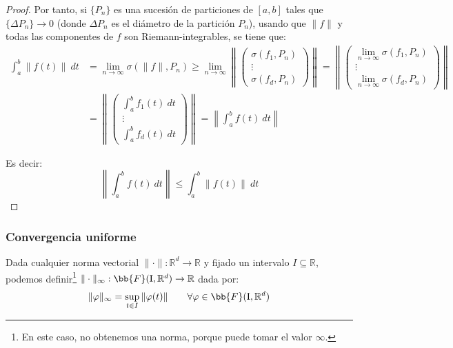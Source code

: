 \begin{prop}
\begin{proof}
        Por tanto, si $\{P_n\}$ es una sucesión de particiones de $[a,b]$ tales que $\{\Delta P_n\}\longrightarrow 0$ (donde $\Delta P_n$ es el diámetro de la partición $P_n$), usando que $\|f\|$ y todas las componentes de $f$ son Riemann-integrables, se tiene que:
        \begin{align*}
            \int_{a}^{b} \|f(t)\|~dt &= \lim_{n\to\infty}\sigma(\|f\|, P_n) \geq \lim_{n\to\infty} \left\| \left(\begin{array}{c}
                \sigma(f_1,P_n) \\
                \vdots  \\
                \sigma(f_d,P_n) 
            \end{array}\right) \right\|    = \left\| \left(\begin{array}{c}
                \displaystyle\lim_{n\to\infty} \sigma(f_1,P_n) \\
                \vdots  \\
                \displaystyle\lim_{n\to\infty}  \sigma(f_d,P_n) 
            \end{array}\right) \right\| \\
                                     &=  \left\| \left(\begin{array}{c}
                \int_{a}^{b} f_1(t)~dt  \\
                \vdots \\
                \int_{a}^{b} f_d(t)~dt  
            \end{array}\right) \right\| = \left\|\int_{a}^{b} f(t)~dt \right\|
        \end{align*}

        Es decir:
    \begin{equation*}
        \left\|\int_{a}^{b} f(t)~dt \right\| \leq \int_{a}^{b} \|f(t)\|~dt 
    \end{equation*}
    \end{proof}
\end{prop}

\subsubsection{Convergencia uniforme}
\noindent
Dada cualquier norma vectorial $\|\cdot \|:\mathbb{R}^d\rightarrow\mathbb{R}$ y fijado un intervalo $I\subseteq \mathbb{R}$, podemos definir\footnote{En este caso, no obtenemos una norma, porque puede tomar el valor $\infty$.} $\|\cdot \|_\infty:\bb{F}(\text{I},\mathbb{R}^d)\rightarrow\mathbb{R}$ dada por:
\begin{equation*}
    \|\varphi\|_\infty = \sup_{t\in I}\|\varphi(t)\| \qquad \forall \varphi \in \bb{F}(\text{I},\mathbb{R}^d)
\end{equation*}

